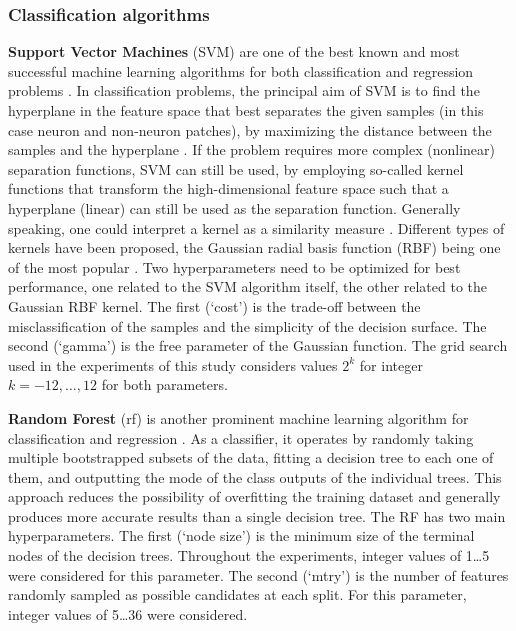 \subsubsection{Classification algorithms}
\label{subsubsec:classifiers}
{\bf Support Vector Machines} (SVM) are one of the best known and most successful machine learning algorithms for both classification and regression problems \cite{boser1992training, vapnik1998statistical, vapnik2013nature, bishop2006pattern}. In classification problems, the principal aim of SVM is to find the hyperplane in the feature space that best separates the given samples (in this case neuron and non-neuron patches), by maximizing the distance between the samples and the hyperplane \cite{burges1998tutorial}. If the problem requires more complex (nonlinear) separation functions, SVM can still be used, by employing so-called kernel functions that transform the high-dimensional feature space such that a hyperplane (linear) can still be used as the separation function. Generally speaking, one could interpret a kernel as a similarity measure \cite{vert2004primer}. Different types of kernels have been proposed, the Gaussian radial basis function (RBF) being one of the most popular \cite{cristianini2000introduction}. Two hyperparameters need to be optimized for best performance, one related to the SVM algorithm itself, the other related to the Gaussian RBF kernel. The first (`cost') is the trade-off between the misclassification of the samples and the simplicity of the decision surface. The second (`gamma') is the free parameter of the Gaussian function. The grid search used in the experiments of this study considers values $2^k$ for integer $k=-12,\dots,12$ for both parameters.

{\bf Random Forest} (\gls{rf}) is another prominent machine learning algorithm for classification and regression \cite{breiman2001random}. As a classifier, it operates by randomly taking multiple bootstrapped subsets of the data, fitting a decision tree to each one of them, and outputting the mode of the class outputs of the individual trees. This approach reduces the possibility of overfitting the training dataset and generally produces more accurate results than a single decision tree. The RF has two main hyperparameters. The first (`node size') is the minimum size of the terminal nodes of the decision trees. Throughout the experiments, integer values of 1\dots5 were considered for this parameter. The second (`mtry') is the number of features randomly sampled as possible candidates at each split. For this parameter, integer values of 5\dots36 were considered.

